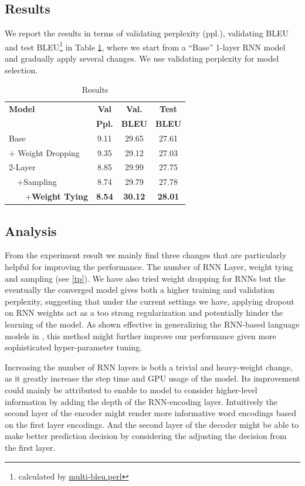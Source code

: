 \documentclass[11pt,a4paper]{article}
\begin{document}
\subsection{Results}
We report the results in terms of validating perplexity (ppl.), validating BLEU and test BLEU\footnote{calculated by \hyperlink{https://github.com/moses-smt/mosesdecoder/blob/master/scripts/generic/multi-bleu.perl}{multi-bleu.perl}} in Table \ref{results}, where we start from a ``Base'' 1-layer RNN model and gradually apply several changes. We use validating perplexity for model selection.
\begin{table}[!htbp]
\centering
\begin{tabular}{l|c|c|c}
  \textbf{Model} & \textbf{Val} & \textbf{Val.} & \textbf{Test} \\
  & \textbf{Ppl.} & \textbf{BLEU} & \textbf{BLEU} \\
  \hline
  Base & 9.11 & 29.65 & 27.61 \\
  $+$ Weight Dropping & 9.35 & 29.12 & 27.03 \\
  2-Layer & 8.85 & 29.99 & 27.75 \\
  ~~$+$Sampling  & 8.74 & 29.79 & 27.78 \\
  ~~~~\textbf{$+$Weight Tying} & \textbf{8.54} & \textbf{30.12} & \textbf{28.01} \\

\end{tabular}
\caption{Results}
\label{results}
\end{table}
\subsection{Analysis}

From the experiment result we mainly find three changes that are particularly helpful for improving the performance. The number of RNN Layer, weight tying and sampling (see \ref{tp}). We have also tried weight dropping for RNNs but the eventually the converged model gives both a higher training and validation perplexity, suggesting that under the current settings we have, applying dropout on RNN weights act as a too strong regularization and potentially hinder the learning of the model. As shown effective in generalizing the RNN-based language models in \citet{merity2017regularizing}, this method might further improve our performance given more sophisticated hyper-parameter tuning.

Increasing the number of RNN layers is both a trivial and heavy-weight change, as it greatly increase the step time and GPU usage of the model. Its improvement could mainly be attributed to enable to model to consider higher-level information by adding the depth of the RNN-encoding layer. Intuitively the second layer of the encoder might render more informative word encodings based on the first layer encodings. And the second layer of the decoder might be able to make better prediction decision by considering the adjusting the decision from the first layer.
\end{document}
